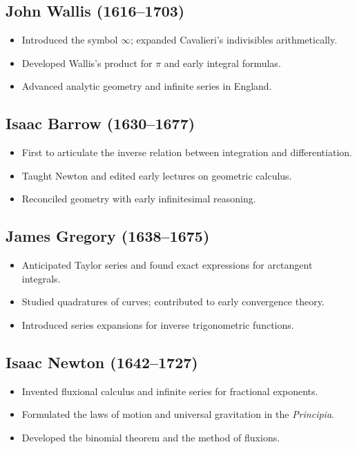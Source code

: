 \documentclass[9pt]{article}
\begin{document}
\subsection*{John Wallis (1616–1703)}
\begin{itemize}
  \item Introduced the symbol $\infty$; expanded Cavalieri’s indivisibles arithmetically.
  \item Developed Wallis’s product for $\pi$ and early integral formulas.
  \item Advanced analytic geometry and infinite series in England.
\end{itemize}

\subsection*{Isaac Barrow (1630–1677)}
\begin{itemize}
  \item First to articulate the inverse relation between integration and differentiation.
  \item Taught Newton and edited early lectures on geometric calculus.
  \item Reconciled geometry with early infinitesimal reasoning.
\end{itemize}

\subsection*{James Gregory (1638–1675)}
\begin{itemize}
  \item Anticipated Taylor series and found exact expressions for arctangent integrals.
  \item Studied quadratures of curves; contributed to early convergence theory.
  \item Introduced series expansions for inverse trigonometric functions.
\end{itemize}

\subsection*{Isaac Newton (1642–1727)}
\begin{itemize}
  \item Invented fluxional calculus and infinite series for fractional exponents.
  \item Formulated the laws of motion and universal gravitation in the \textit{Principia}.
  \item Developed the binomial theorem and the method of fluxions.
\end{itemize}
\end{document}
